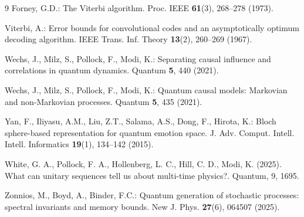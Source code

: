 \documentclass[11pt, reco]{article}
\begin{document}
\begin{thebibliography}{9}
Forney, G.D.:
The Viterbi algorithm.
Proc. IEEE \textbf{61}(3), 268–278 (1973).

Viterbi, A.:
Error bounds for convolutional codes and an asymptotically optimum decoding algorithm.
IEEE Trans. Inf. Theory \textbf{13}(2), 260–269 (1967).

Wechs, J., Milz, S., Pollock, F., Modi, K.:
Separating causal influence and correlations in quantum dynamics.
Quantum \textbf{5}, 440 (2021).

Wechs, J., Milz, S., Pollock, F., Modi, K.:
Quantum causal models: Markovian and non-Markovian processes.
Quantum \textbf{5}, 435 (2021).

Yan, F., Iliyasu, A.M., Liu, Z.T., Salama, A.S., Dong, F., Hirota, K.:
Bloch sphere-based representation for quantum emotion space.
J. Adv. Comput. Intell. Intell. Informatics \textbf{19}(1), 134–142 (2015).

 White, G. A., Pollock, F. A., Hollenberg, L. C., Hill, C. D.,   Modi, K. (2025). What can unitary sequences tell us about multi-time physics?. Quantum, 9, 1695.

Zonnios, M., Boyd, A., Binder, F.C.:
Quantum generation of stochastic processes: spectral invariants and memory bounds.
New J. Phys. \textbf{27}(6), 064507 (2025).

\end{thebibliography}
\end{document}
